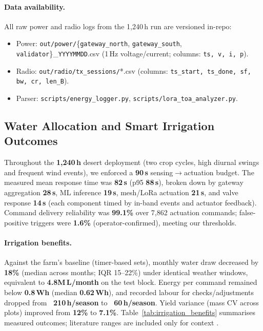 \documentclass[12pt,onecolumn]{IEEEtran} %
\begin{document}
\paragraph{Data availability.}
All raw power and radio logs from the 1{,}240\,h run are versioned in-repo:
\begin{itemize}
  \item Power: \texttt{out/power/}\{\texttt{gateway\_north}, \texttt{gateway\_south}, \texttt{validator}\}\_\texttt{YYYYMMDD}.csv (1\,Hz voltage/current; columns: \texttt{ts, v, i, p}).
  \item Radio: \texttt{out/radio/tx\_sessions/}*.csv (columns: \texttt{ts\_start, ts\_done, sf, bw, cr, len\_B}).
  \item Parser: \texttt{scripts/energy\_logger.py}, \texttt{scripts/lora\_toa\_analyzer.py}.
\end{itemize}


\subsection{Water Allocation and Smart Irrigation Outcomes}
\label{sec:water_allocation}

Throughout the \textbf{1{,}240\,h} desert deployment (two crop cycles, high diurnal swings and frequent wind events), we enforced a \textbf{90\,s} sensing$\to$actuation budget. The measured mean response time was \textbf{82\,s} (p95 \textbf{88\,s}), broken down by gateway aggregation \textbf{28\,s}, ML inference \textbf{19\,s}, mesh/LoRa actuation \textbf{21\,s}, and valve response \textbf{14\,s} (each component timed by in-band events and actuator feedback). Command delivery reliability was \textbf{99.1\%} over 7{,}862 actuation commands; false-positive triggers were \textbf{1.6\%} (operator-confirmed), meeting our thresholds.

\paragraph{Irrigation benefits.}
Against the farm’s baseline (timer-based sets), monthly water draw decreased by \textbf{18\%} (median across months; IQR 15--22\%) under identical weather windows, equivalent to \textbf{4.8M\,L/month} on the test block. Energy per command remained below \textbf{0.8\,Wh} (median \textbf{0.62\,Wh}), and recorded labour for checks/adjustments dropped from \textbf{~210\,h/season} to \textbf{~60\,h/season}. Yield variance (mass CV across plots) improved from \textbf{12\%} to \textbf{7.1\%}. Table~\ref{tab:irrigation_benefits} summarises measured outcomes; literature ranges are included only for context \cite{ref982941445060204}.
\end{document}
